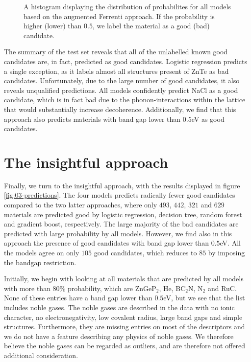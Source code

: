 \begin{figure}[ht!]
    \centering
    
    \vspace*{-130mm}
    \caption{A histogram displaying the distribution of probabilites for all models based on the augmented Ferrenti approach. If the probability is higher (lower) than $0.5$, we label the material as a good (bad) candidate.}
    \label{fig:histogram-augmented-ferrenti}
\end{figure}

The summary of the test set reveals that all of the unlabelled known good candidates are, in fact, predicted as good candidates. Logistic regression predicts a single exception, as it labels almost all structures present of ZnTe as bad candidates. Unfortunately, due to the large number of good candidates, it also reveals unqualified predictions. All models confidently predict NaCl as a good candidate, which is in fact bad due to the phonon-interactions within the lattice that would substantially increase decoherence. Additionally, we find that this approach also predicts materials with band gap lower than $0.5$eV as good candidates.


\section{The insightful approach}

Finally, we turn to the insightful approach, with the results displayed in figure \ref{fig:03-predictions}. The four models predicts radically fewer good candidates compared to the two latter approaches, where only $493$, $442$, $321$ and $629$ materials are predicted good by logistic regression, decision tree, random forest and gradient boost, respectively. The large majority of the bad candidates are predicted with large probability by all models. However, we find also in this approach the presence of good candidates with band gap lower than $0.5$eV. All the models agree on only $105$ good candidates, which reduces to $85$ by imposing the bandgap restriction.



Initially, we begin with looking at all materials that are predicted by all models with more than $80\%$ probability, which are ZnGeP$_2$, He, BC$_2$N, N$_2$ and RuC. None of these entries have a band gap lower than $0.5$eV, but we see that the list includes noble gases. The noble gases are described in the data with no ionic character, no electronegativity, low covalent radius, large band gaps and simple structures. Furthermore, they are missing entries on most of the descriptors and we do not have a feature describing any physics of noble gases. We therefore believe the noble gases can be regarded as outliers, and are therefore not offered additional consideration.

